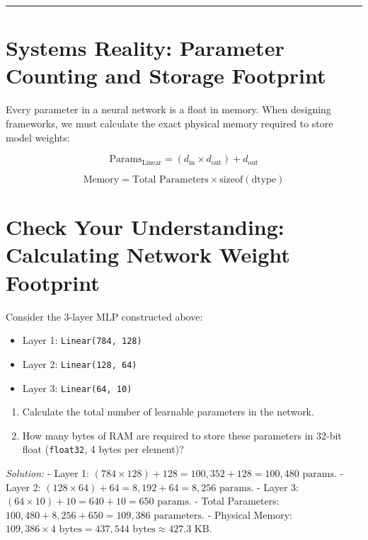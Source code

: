 \documentclass[
  letterpaper,
]{scrbook}
\providecommand{\tightlist}{%
  \setlength{\itemsep}{0pt}\setlength{\parskip}{0pt}}
\begin{document}
\begin{center}\rule{0.5\linewidth}{0.5pt}\end{center}

\section{Systems Reality: Parameter Counting and Storage
Footprint}\label{systems-reality-parameter-counting-and-storage-footprint}

Every parameter in a neural network is a float in memory. When designing
frameworks, we must calculate the exact physical memory required to
store model weights:

\[\text{Params}_{\text{Linear}} = (d_{\text{in}} \times d_{\text{out}}) + d_{\text{out}}\]

\[\text{Memory} = \text{Total Parameters} \times \text{sizeof}(\text{dtype})\]

\section{Check Your Understanding: Calculating Network Weight
Footprint}\label{check-your-understanding-calculating-network-weight-footprint}

Consider the 3-layer MLP constructed above:

\begin{itemize}
\tightlist
\item
  Layer 1: \texttt{Linear(784,\ 128)}
\item
  Layer 2: \texttt{Linear(128,\ 64)}
\item
  Layer 3: \texttt{Linear(64,\ 10)}
\end{itemize}

\begin{enumerate}
\def\labelenumi{\arabic{enumi}.}
\tightlist
\item
  Calculate the total number of learnable parameters in the network.
\item
  How many bytes of RAM are required to store these parameters in 32-bit
  float (\texttt{float32}, 4 bytes per element)?
\end{enumerate}

\emph{Solution:} - Layer 1:
\((784 \times 128) + 128 = 100,352 + 128 = 100,480\text{ params}\). -
Layer 2: \((128 \times 64) + 64 = 8,192 + 64 = 8,256\text{ params}\). -
Layer 3: \((64 \times 10) + 10 = 640 + 10 = 650\text{ params}\). - Total
Parameters: \(100,480 + 8,256 + 650 = 109,386\text{ parameters}\). -
Physical Memory:
\(109,386 \times 4\text{ bytes} = 437,544\text{ bytes} \approx 427.3\text{ KB}\).
\end{document}
